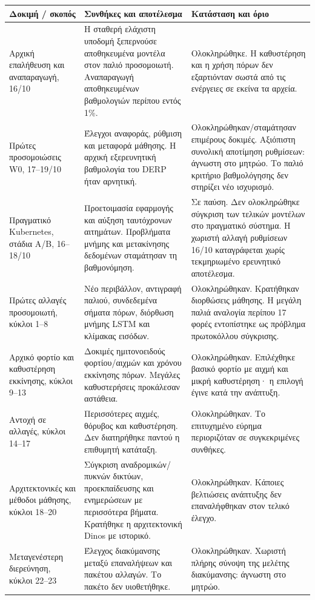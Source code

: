 \documentclass[10pt,a4paper]{article}
\begin{document}
\begin{tabular}{p{3.0cm}p{6.2cm}p{5.8cm}}\toprule
Δοκιμή / σκοπός & Συνθήκες και αποτέλεσμα & Κατάσταση και όριο\\\midrule
Αρχική επαλήθευση και αναπαραγωγή, 16/10 & Η σταθερή ελάχιστη υποδομή ξεπερνούσε αποθηκευμένα μοντέλα στον παλιό προσομοιωτή. Αναπαραγωγή αποθηκευμένων βαθμολογιών περίπου εντός 1\%. & Ολοκληρώθηκε. Η καθυστέρηση και η χρήση πόρων δεν εξαρτιόνταν σωστά από τις ενέργειες σε εκείνα τα αρχεία.\\
Πρώτες προσομοιώσεις W0, 17--19/10 & Έλεγχοι αναφοράς, ρύθμιση και μεταφορά μάθησης. Η αρχική εξερευνητική βαθμολογία του DERP ήταν αρνητική. & Ολοκληρώθηκαν/σταμάτησαν επιμέρους δοκιμές. Αξιόπιστη συνολική αποτίμηση ρυθμίσεων: άγνωστη στο μητρώο. Το παλιό κριτήριο βαθμολόγησης δεν στηρίζει νέο ισχυρισμό.\\
Πραγματικό Kubernetes, στάδια Α/Β, 16--18/10 & Προετοιμασία εφαρμογής και αύξηση ταυτόχρονων αιτημάτων. Προβλήματα μνήμης και μετακίνησης δεδομένων σταμάτησαν τη βαθμονόμηση. & Σε παύση. Δεν ολοκληρώθηκε σύγκριση των τελικών μοντέλων στο πραγματικό σύστημα. Η χωριστή αλλαγή ρυθμίσεων 16/10 καταγράφεται χωρίς τεκμηριωμένο ερευνητικό αποτέλεσμα.\\
Πρώτες αλλαγές προσομοιωτή, κύκλοι 1--8 & Νέο περιβάλλον, αντιγραφή παλιού, συνδεδεμένα σήματα πόρων, διόρθωση μνήμης LSTM και κλίμακας εισόδων. & Ολοκληρώθηκαν. Κρατήθηκαν διορθώσεις μάθησης. Η μεγάλη παλιά αναλογία περίπου 17 φορές εντοπίστηκε ως πρόβλημα πρωτοκόλλου σύγκρισης.\\
Αρχικό φορτίο και καθυστέρηση εκκίνησης, κύκλοι 9--13 & Δοκιμές ημιτονοειδούς φορτίου/αιχμών και χρόνου εκκίνησης πόρων. Μεγάλες καθυστερήσεις προκάλεσαν αστάθεια. & Ολοκληρώθηκαν. Επιλέχθηκε βασικό φορτίο με αιχμή και μικρή καθυστέρηση· η επιλογή έγινε κατά την ανάπτυξη.\\
Αντοχή σε αλλαγές, κύκλοι 14--17 & Περισσότερες αιχμές, θόρυβος και καθυστέρηση. Δεν διατηρήθηκε παντού η επιθυμητή κατάταξη. & Ολοκληρώθηκαν. Το επιτυχημένο εύρημα περιοριζόταν σε συγκεκριμένες συνθήκες.\\
Αρχιτεκτονικές και μέθοδοι μάθησης, κύκλοι 18--20 & Σύγκριση αναδρομικών/πυκνών δικτύων, προεκπαίδευσης και ενημερώσεων με περισσότερα βήματα. Κρατήθηκε η αρχιτεκτονική Dinos με ιστορικό. & Ολοκληρώθηκαν. Κάποιες βελτιώσεις ανάπτυξης δεν επαναλήφθηκαν στον τελικό έλεγχο.\\
Μεταγενέστερη διερεύνηση, κύκλοι 22--23 & Έλεγχος διακύμανσης μεταξύ επαναλήψεων και πακέτου αλλαγών. Το πακέτο δεν υιοθετήθηκε. & Ολοκληρώθηκαν. Χωριστή πλήρης σύνοψη της μελέτης διακύμανσης: άγνωστη στο μητρώο.\\\bottomrule
\end{tabular}
\end{document}
